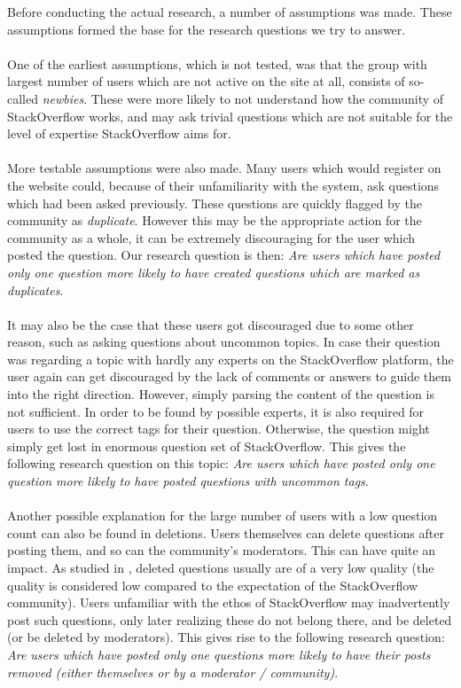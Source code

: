 \documentclass[conference]{IEEEtran}
\begin{document}
Before conducting the actual research, a number of assumptions was made. These assumptions formed the base for the research questions we try to answer.
\\
\\
One of the earliest assumptions, which is not tested, was that the group with largest number of users which are not active on the site at all, consists of so-called \textit{newbies}. These were more likely to not understand how the community of StackOverflow works, and may ask trivial questions which are not suitable for the level of expertise StackOverflow aims for.
\\
\\
More testable assumptions were also made. Many users which would register on the website could, because of their unfamiliarity with the system, ask questions which had been asked previously. These questions are quickly flagged by the community as \textit{duplicate}. However this may be the appropriate action for the community as a whole, it can be extremely discouraging for the user which posted the question. Our research question is then: \textit{Are users which have posted only one question more likely to have created questions which are marked as duplicates}.
\\
\\
It may also be the case that these users got discouraged due to some other reason, such as asking questions about uncommon topics. In case their question was regarding a topic with hardly any experts on the StackOverflow platform, the user again can get discouraged by the lack of comments or answers to guide them into the right direction. However, simply parsing the content of the question is not sufficient. In order to be found by possible experts, it is also required for users to use the correct tags for their question. Otherwise, the question might simply get lost in enormous question set of StackOverflow. This gives the following research question on this topic: \textit{Are users which have posted only one question more likely to have posted questions with uncommon tags}.
\\
\\
Another possible explanation for the large number of users with a low question count can also be found in deletions. Users themselves can delete questions after posting them, and so can the community's moderators. This can have quite an impact. As studied in \cite{correa2014chaff}, deleted questions usually are of a very low quality (the quality is considered low compared to the expectation of the StackOverflow community). Users unfamiliar with the ethos of StackOverflow may inadvertently post such questions, only later realizing these do not belong there, and be deleted (or be deleted by moderators). This gives rise to the following research question: \textit{Are users which have posted only one questions more likely to have their posts removed (either themselves or by a moderator / community)}.
\end{document}
